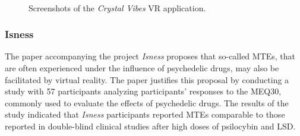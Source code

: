 \begin{figure}%
    \centering
    \\
    \caption{Screenshots of the \textit{Crystal Vibes} \ac{VR} application.}%
    \label{fig:outram2017crystal}%
\end{figure}

\subsubsection{Isness}
The paper \autocite{glowacki2020isness} accompanying the project \textit{Isness} proposes that so-called \acp{MTE}, that are often experienced under the influence of psychedelic drugs, may also be facilitated by virtual reality. The paper justifies this proposal by conducting a study with 57 participants analyzing participants' responses to the \ac{MEQ30}, commonly used to evaluate the effects of psychedelic drugs. The results of the study indicated that \textit{Isness} participants reported \acp{MTE} comparable to those reported in double-blind clinical studies after high doses of psilocybin and LSD.

